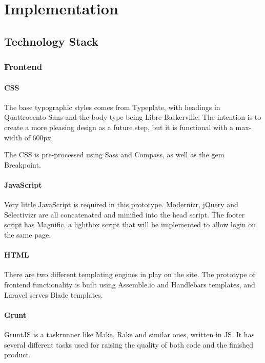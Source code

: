 \chapter{Implementation}
\label{ch:implementation}

\section{Technology Stack}
\label{sec:technologies}

\subsection{Frontend}

\subsubsection{CSS}
\noindent
The base typographic styles comes from Typeplate\citep{Typeplate2013}, with headings in Quattrocento Sans and the body type being Libre Baskerville. The intention is to create a more pleasing design as a future step, but it is functional with a max-width of 600px.

The CSS is pre-processed using Sass and Compass, as well as the gem Breakpoint.

\subsubsection{JavaScript}
\noindent
Very little JavaScript is required in this prototype. Modernizr, jQuery and Selectivizr are all concatenated and minified into the head script. The footer script has Magnific, a lightbox script that will be implemented to allow login on the same page.

\subsubsection{HTML}
\noindent
There are two different templating engines in play on the site. The prototype of frontend functionality is built using Assemble.io and Handlebars templates, and Laravel serves Blade templates.

\subsubsection{Grunt}
\noindent
GruntJS is a taskrunner like Make, Rake and similar ones, written in JS. It has several different tasks used for raising the quality of both code and the finished product.

